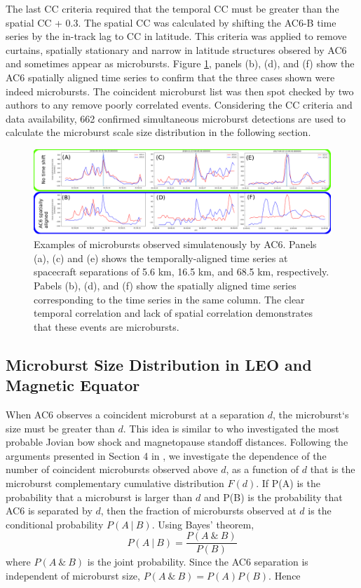 \documentclass[draft]{agujournal2019}
\begin{document}
The last CC criteria required that the temporal CC must be greater than the spatial CC + 0.3. The spatial CC was calculated by shifting the AC6-B time series by the in-track lag to CC in latitude. This criteria was applied to remove curtains, spatially stationary and narrow in latitude structures obsered by AC6 \cite{Blake2016} and sometimes appear as microbursts. Figure \ref{fig2}, panels (b), (d), and (f) show the AC6 spatially aligned time series to confirm that the three cases shown were indeed microbursts. The coincident microburst list was then spot checked by two authors to any remove poorly correlated events. Considering the CC criteria and data availability, 662 confirmed simultaneous microburst detections are used to calculate the microburst scale size distribution in the following section.

\begin{figure}
\includegraphics[width=\textwidth]{fig2.png}
\caption{Examples of microbursts observed simulatenously by AC6. Panels (a), (c) and (e) shows the temporally-aligned time series at spacecraft separations of 5.6 km, 16.5 km, and 68.5 km, respectively. Pabels (b), (d), and (f) show the spatially aligned time series corresponding to the time series in the same column. The clear temporal correlation and lack of spatial correlation demonstrates that these events are microbursts.} 
\label{fig2}
\end{figure}
	

\subsection{Microburst Size Distribution in LEO and Magnetic Equator}\label{microburst_distribution}
When AC6 observes a coincident microburst at a separation $d$, the microburst`s size must be greater than $d$. This idea is similar to  who investigated the most probable Jovian bow shock and magnetopause standoff distances. Following the arguments presented in Section 4 in , we investigate the dependence of the number of coincident microbursts observed above $d$, as a function of $d$ that is the microburst complementary cumulative distribution $F(d)$.  If P(A) is the probability that a microburst is larger than $d$ and P(B) is the probability that AC6 is separated by $d$, then the fraction of microbursts observed at $d$ is the conditional probability $P(A \ \vert \ B)$. Using Bayes’ theorem, 
\begin{equation}
P(A \ \vert \ B) = \frac{P(A \ \& \ B)}{P(B)}
\end{equation} where $P(A \ \& \ B)$ is the joint probability. Since the AC6 separation is independent of microburst size, $P(A \ \& \ B) = P(A)P(B)$. Hence
\end{document}
